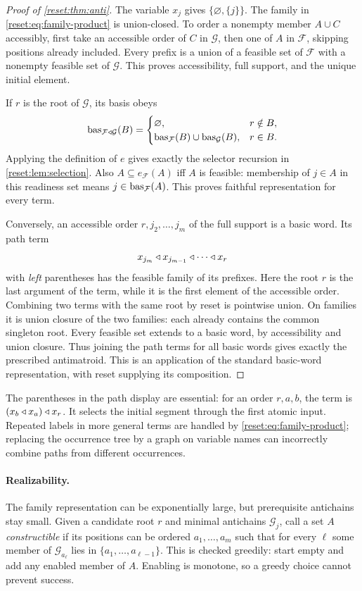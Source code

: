 \begin{proof}[Proof of \cref{reset:thm:anti}]
The variable $x_j$ gives $\{\varnothing,\{j\}\}$.
The family in \eqref{reset:eq:family-product} is union-closed. To order a
nonempty member $A\cup C$ accessibly, first take an accessible order of
$C$ in $\mathcal G$, then one of $A$ in $\mathcal F$, skipping positions
already included. Every prefix is a union of a feasible set of
$\mathcal F$ with a nonempty feasible set of $\mathcal G$. This proves
accessibility, full support, and the unique initial element.

If $r$ is the root of $\mathcal G$, its basis obeys
\[
 \operatorname{bas}_{\mathcal F\mathbin{\triangleleft}\mathcal G}(B)=
 \begin{cases}
 \varnothing,&r\notin B,\\
 \operatorname{bas}_{\mathcal F}(B)\cup\operatorname{bas}_{\mathcal G}(B),&r\in B.
 \end{cases}
\]
Applying the definition of $e$ gives exactly the selector recursion
in \cref{reset:lem:selection}. Also
$A\subseteq e_{\mathcal F}(A)$ iff $A$ is feasible: membership of
$j\in A$ in this readiness set means $j\in\operatorname{bas}_{\mathcal F}(A)$.
This proves faithful representation for every term.

Conversely, an accessible order $r,j_2,\ldots,j_m$ of the full support
is a basic word. Its path term
\[
 x_{j_m}\mathbin{\triangleleft} x_{j_{m-1}}\mathbin{\triangleleft}\cdots\mathbin{\triangleleft} x_r
\]
with \emph{left} parentheses has the feasible family of its prefixes.
Here the root $r$ is the last argument of the term, while it is the
first element of the accessible order. Combining two terms with the
same root by reset is pointwise union. On families it is union closure
of the two families: each already contains the common singleton root.
Every feasible set extends to a basic word, by accessibility and union
closure. Thus joining the path terms for all basic words gives exactly
the prescribed antimatroid. This is an application of the standard
basic-word representation, with reset supplying its composition.
\end{proof}

The parentheses in the path display are essential: for an order $r,a,b$, the term is $(x_b\mathbin{\triangleleft} x_a)\mathbin{\triangleleft} x_r$. It selects the initial segment through the first atomic input. Repeated labels in more general terms are handled by \eqref{reset:eq:family-product}; replacing the occurrence tree by a graph on
variable names can incorrectly combine paths from different occurrences.

\paragraph{Realizability.}
The family representation can be exponentially large, but prerequisite antichains stay small. Given a candidate root $r$ and minimal antichains $\mathcal G_j$, call a set $A$ \emph{constructible} if its positions can be ordered $a_1,\ldots,a_m$ such that for every $\ell$ some member of $\mathcal G_{a_\ell}$ lies in
$\{a_1,\ldots,a_{\ell-1}\}$. This is checked greedily: start empty and add any enabled member of $A$. Enabling is monotone, so a greedy choice cannot prevent success.

